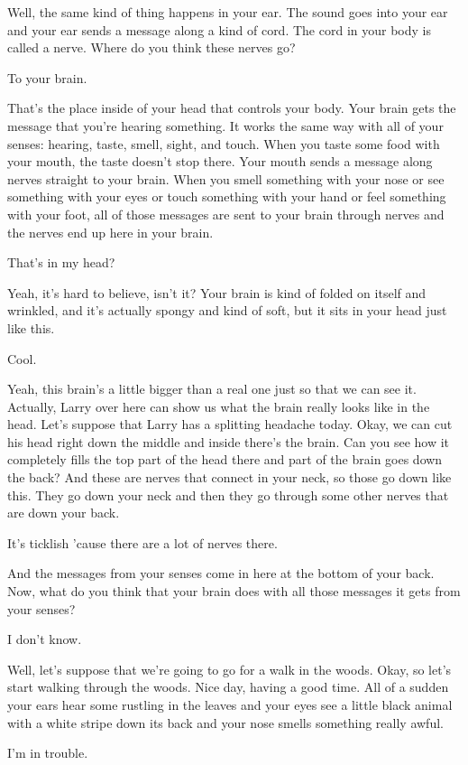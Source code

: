 Well, the same kind of thing happens in your ear. The sound goes into your ear and your ear sends a message along a kind of cord. The cord in your body is called a nerve. Where do you think these nerves go?

To your brain.

That's the place inside of your head that controls your body. Your brain gets the message that you're hearing something. It works the same way with all of your senses: hearing, taste, smell, sight, and touch. When you taste some food with your mouth, the taste doesn't stop there. Your mouth sends a message along nerves straight to your brain. When you smell something with your nose or see something with your eyes or touch something with your hand or feel something with your foot, all of those messages are sent to your brain through nerves and the nerves end up here in your brain.

That's in my head?

Yeah, it's hard to believe, isn't it? Your brain is kind of folded on itself and wrinkled, and it's actually spongy and kind of soft, but it sits in your head just like this.

Cool.

Yeah, this brain's a little bigger than a real one just so that we can see it. Actually, Larry over here can show us what the brain really looks like in the head. Let's suppose that Larry has a splitting headache today. Okay, we can cut his head right down the middle and inside there's the brain. Can you see how it completely fills the top part of the head there and part of the brain goes down the back? And these are nerves that connect in your neck, so those go down like this. They go down your neck and then they go through some other nerves that are down your back.

It's ticklish 'cause there are a lot of nerves there.

And the messages from your senses come in here at the bottom of your back. Now, what do you think that your brain does with all those messages it gets from your senses?

I don't know.

Well, let's suppose that we're going to go for a walk in the woods. Okay, so let's start walking through the woods. Nice day, having a good time. All of a sudden your ears hear some rustling in the leaves and your eyes see a little black animal with a white stripe down its back and your nose smells something really awful.

I'm in trouble.

